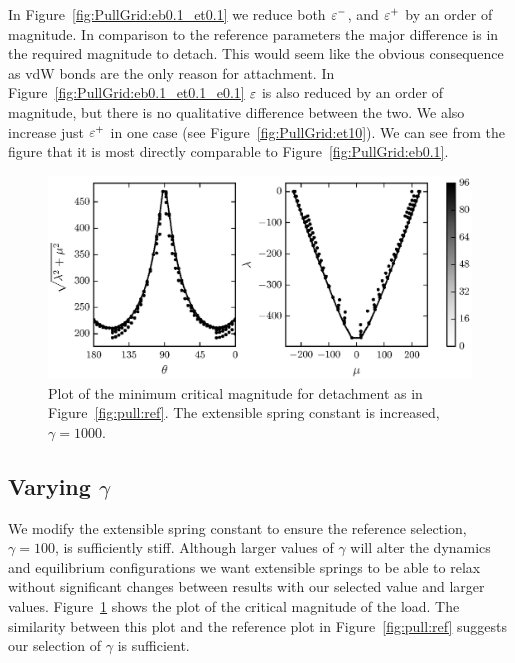 In Figure~\ref{fig:PullGrid:eb0.1_et0.1} we reduce both $\varepsilon^-$, and $\varepsilon^+$ by an order of magnitude. In comparison to the reference parameters the major difference is in the required magnitude to detach. This would seem like the obvious consequence as vdW bonds are the only reason for attachment. In Figure~\ref{fig:PullGrid:eb0.1_et0.1_e0.1} $\varepsilon$ is also reduced by an order of magnitude, but there is no qualitative difference between the two. We also increase just $\varepsilon^+$ in one case (see Figure~\ref{fig:PullGrid:et10}). We can see from the figure that it is most directly comparable to Figure~\ref{fig:PullGrid:eb0.1}.

	\begin{figure}
		\begin{center}
			\includegraphics{./fig/ch3/pull/g1000/grid.eps}
		\end{center}		
		\caption{Plot of the minimum critical magnitude for detachment as in Figure~\ref{fig:pull:ref}. The extensible spring constant is increased, $\gamma=1000$.
		\label{fig:pull:g1000}}
	\end{figure}

\subsection{Varying $\gamma$}

We modify the extensible spring constant to ensure the reference selection, $\gamma=100$, is sufficiently stiff. Although larger values of $\gamma$ will alter the dynamics and equilibrium configurations we want extensible springs to be able to relax without significant changes between results with our selected value and larger values. Figure~\ref{fig:pull:g1000} shows the plot of the critical magnitude of the load. The similarity between this plot and the reference plot in Figure~\ref{fig:pull:ref} suggests our selection of $\gamma$ is sufficient.

